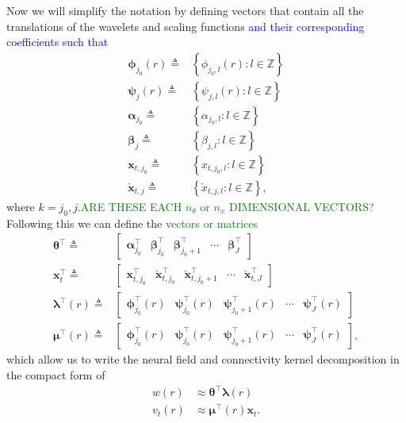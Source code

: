 \documentclass[11pt,draftcls,onecolumn,peerreview]{IEEEtran}
\newcommand{\dean}[1]{\textcolor{green}{#1}}
\newcommand{\parham}[1]{\textcolor{blue}{#1}}
\begin{document}
Now we will simplify the notation by defining vectors that contain all the translations of the wavelets and scaling functions \parham{and their corresponding coefficients such that}
\begin{align}      
	\boldsymbol\phi_{j_0}(r) \triangleq&\left\lbrace{\phi_{j_0,l}(r)}:l \in \mathbb{Z} \right\rbrace \\
	\boldsymbol\psi_{j}(r) \triangleq& \left\lbrace{\psi_{j,l}(r)}:l \in \mathbb{Z} \right\rbrace\\
	\boldsymbol\alpha_{j_0} \triangleq& \left\lbrace\alpha_{j_0, l}:l \in \mathbb{Z} \right\rbrace \\
	\boldsymbol\beta_{j} \triangleq& \left\lbrace\beta_{j, l}:l \in \mathbb{Z} \right\rbrace \\
	\mathbf{x}_{t,j_0} \triangleq& \left\lbrace{x}_{t,j_{0},l}:l \in \mathbb{Z} \right\rbrace \\
	\check{\mathbf{x}}_{t,j} \triangleq& \left\lbrace{\check{x}}_{t,j,l}:l \in \mathbb{Z} \right\rbrace,
\end{align}
where $k = j_0,j$.\dean{ARE THESE EACH $n_{\theta}$ or $n_x$ DIMENSIONAL VECTORS?} Following this we can define the \dean{vectors or matrices} 
\begin{align}
\boldsymbol\theta^\top \triangleq& [\begin{array}{ccccc} \boldsymbol\alpha_{j_0}^\top & \boldsymbol\beta_{j_0}^\top & \boldsymbol\beta_{j_0+1}^\top & \cdots & \boldsymbol\beta_{J}^\top \end{array}] 
\label{KernelWeights} \\
\mathbf{x}_{t}^\top \triangleq& [\begin{array}{ccccc}\mathbf{x}_{t,j_{0}}^\top &  \check{\mathbf{x}}_{t,j_{0}}^\top & \check{\mathbf{x}}_{t,j_{0}+1}^\top & \cdots & \check{\mathbf{x}}_{t,J}^\top\end{array}]
\label{FieldWeights} \\
\label{KernelBasisVector}
\boldsymbol\lambda^\top(r) \triangleq& \left[
\begin{array}{ccccc} \boldsymbol\phi_{j_0}^\top(r) &
\boldsymbol\psi_{j_0}^\top(r) & 
\boldsymbol\psi_{j_0+1}^\top(r) &
\cdots &
\boldsymbol\psi_{J}^\top(r)\end{array}\right] \\
\label{FieldBasisVector}
\boldsymbol\mu^\top (r) \triangleq& \left[
\begin{array}{ccccc}\boldsymbol\phi_{j_0}^\top(r) &
\boldsymbol\psi_{j_0}^\top(r) & 
\boldsymbol\psi_{j_0+1}^\top(r) &
\cdots &
\boldsymbol\psi_{J}^\top(r)\end{array}\right],
\end{align}
which allow us to write the neural field and connectivity kernel decomposition in the compact form of
\begin{align}
	w\left(r\right) &\approx \boldsymbol\theta^\top\boldsymbol\lambda\left(r\right) 
	\label{eq:KernelFiniteExpansion} \\
	v_t\left(r\right) &\approx \boldsymbol\mu^\top\left(r\right)\mathbf{x}_t.
	\label{eq:FieldFiniteExpansion}
\end{align}
\end{document}
